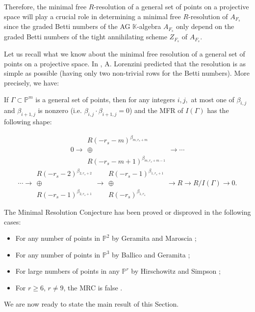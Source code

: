 \documentclass[12pt,twoside]{amsart}
\numberwithin{equation}{section} \hyphenation{semi-stable}
\newcommand {\PP}{\mathbb{P}}
\newcommand{\K}{\mathbb{K}}
\theoremstyle{definition}
\begin{document}
Therefore, the minimal free $R$-resolution  of a general set of points on a projective space will play a crucial role in determining a minimal free $R$-resolution of $A_{F_s}$ since the graded Betti numbers of the AG $\K$-algebra $A_{F_s}$ only depend on the graded Betti numbers of the tight annihilating scheme $Z_{F_s}$ of $A_{F_s}$. 

Let us recall what we know about  the minimal free resolution of a general set of points on a projective space. In \cite{L}, A. Lorenzini  predicted that the resolution is as simple as possible (having only two non-trivial rows for the Betti numbers). More precisely, we have:

\vskip 4mm
  If $\Gamma \subset \PP^m$ is a general set of points, then for any integers $i, j,$ at most one of $\beta _{i,j}$ and $\beta_{i+1,j}$  is nonzero (i.e.  $\beta_{i,j}\cdot \beta_{i+1,j}=0$)   and the MFR of $I(\Gamma)$ has the following shape:

$$
0\longrightarrow  \begin{array}{c} R(-r_s-m)^{\beta_{m,r_s+m}} \\ \oplus \\ R(-r_s-m+1)^{\beta_{m,r_s+m-1}} \end{array}\longrightarrow \cdots
$$
\vskip 2mm
$$ \cdots
\longrightarrow \begin{array}{c} R(-r_s-2)^{\beta_{2,r_s+2}} \\  \oplus \\ R(-r_s-1)^{\beta_{2,r_s+1}} \end{array}
\longrightarrow \begin{array}{c} R(-r_s-1)^{\beta_{1,r_s+1}} \\ \oplus \\ R(-r_s)^{\beta_{1,r_s}} \end{array} \longrightarrow R \longrightarrow R/I(\Gamma) \longrightarrow 0.
$$

\vskip 4mm
The Minimal Resolution Conjecture has been proved or disproved in the following cases:

\begin{itemize}
    \item 
For any number of points in $\PP^2$ by Geramita and Maroscia \cite{GM};
\item For any number of points in $\PP^3$ by Ballico and Geramita \cite{BG};
\item For large numbers of points in any $\PP^r$ by Hirschowitz and Simpson \cite{HS};
\item For $r\ge 6$, $r\ne 9$, the MRC is false \cite{EPSW}.
\end{itemize} 
We are now ready to state the main result of this Section.
\end{document}
